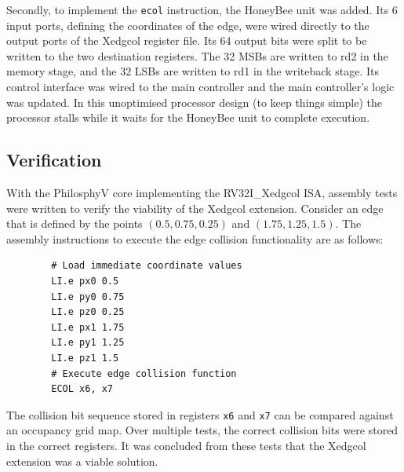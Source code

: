         Secondly, to implement the \texttt{ecol} instruction, the HoneyBee unit was added. Its 6 input ports, defining the coordinates of the edge, were wired directly to the output ports of the Xedgcol register file. Its 64 output bits were split to be written to the two destination registers. The 32 \glspl{MSB} are written to rd2 in the memory stage, and the 32 \glspl{LSB} are written to rd1 in the writeback stage. Its control interface was wired to the main controller and the main controller's logic was updated. In this unoptimised processor design (to keep things simple) the processor stalls while it waits for the HoneyBee unit to complete execution.

        


    \subsection{Verification}
        With the PhilosphyV core implementing the RV32I\_Xedgcol ISA, assembly tests were written to verify the viability of the Xedgcol extension. Consider an edge that is defined by the points $(0.5, 0.75, 0.25)$ and $(1.75, 1.25, 1.5)$. The assembly instructions to execute the edge collision functionality are as follows:

        \begin{verbatim}
        # Load immediate coordinate values
        LI.e px0 0.5
        LI.e py0 0.75
        LI.e pz0 0.25
        LI.e px1 1.75
        LI.e py1 1.25
        LI.e pz1 1.5
        # Execute edge collision function
        ECOL x6, x7
        \end{verbatim}

        The collision bit sequence stored in registers \texttt{x6} and \texttt{x7} can be compared against an occupancy grid map. Over multiple tests, the correct collision bits were stored in the correct registers. It was concluded from these tests that the Xedgcol extension was a viable solution.
